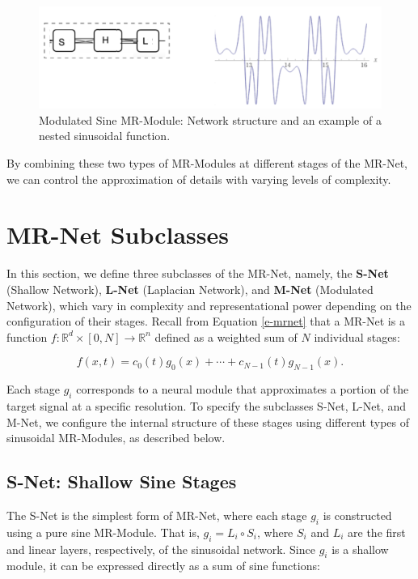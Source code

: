 \begin{figure}[!h]
\centering
\includegraphics[width=0.9\linewidth]{img/ch4/modulated-sine.png}
\caption{Modulated Sine MR-Module: Network structure and an example of a nested sinusoidal function.}
\label{f:modulated}
\end{figure}

By combining these two types of MR-Modules at different stages of the MR-Net, we can control the approximation of details with varying levels of complexity.


\section{MR-Net Subclasses}

In this section, we define three subclasses of the MR-Net, namely, the \textbf{S-Net} (Shallow Network), \textbf{L-Net} (Laplacian Network), and \textbf{M-Net} (Modulated Network), which vary in complexity and representational power depending on the configuration of their stages. Recall from Equation \ref{e-mrnet} that a MR-Net is a function \( f : \mathbb{R}^d \times [0, N] \to \mathbb{R}^n \) defined as a weighted sum of \( N \) individual stages:

\[
f(x, t) = c_0(t)g_0(x) + \cdots + c_{N-1}(t)g_{N-1}(x).
\]

Each stage \( g_i \) corresponds to a neural module that approximates a portion of the target signal at a specific resolution. To specify the subclasses S-Net, L-Net, and M-Net, we configure the internal structure of these stages using different types of sinusoidal MR-Modules, as described below.

\subsection{S-Net: Shallow Sine Stages}

The S-Net is the simplest form of MR-Net, where each stage \( g_i \) is constructed using a pure sine MR-Module. That is, \( g_i = L_i \circ S_i \), where \( S_i \) and \( L_i \) are the first and linear layers, respectively, of the sinusoidal network. Since \( g_i \) is a shallow module, it can be expressed directly as a sum of sine functions:

